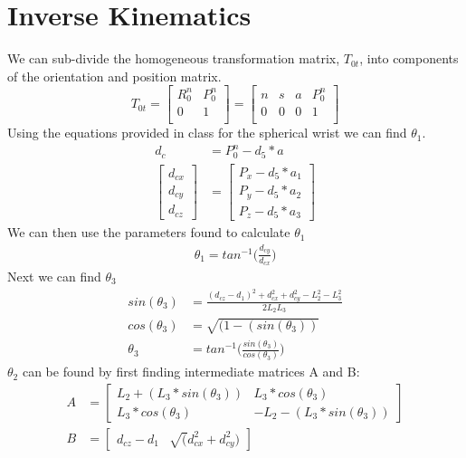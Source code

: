 \documentclass[12pt]{article}
\begin{document}
\section{Inverse Kinematics}
We can sub-divide the homogeneous transformation matrix, $T_{0t}$, into components of the orientation and position matrix.
\[
T_{0t} =
\begin{bmatrix}
         R_0^n & P_0^n\\
         0 & 1 \\
\end{bmatrix}
 = 
\begin{bmatrix}
         n & s & a & P_0^n\\
         0 & 0 & 0 & 1\\
\end{bmatrix}
\]
Using the equations provided in class for the spherical wrist we can find $\theta_1$.
\begin{align}
    d_c &= P_0^n - d_5*a\nonumber\\
    \begin{bmatrix}
         d_{cx}\\
         d_{cy}\\
         d_{cz}
\end{bmatrix}
&= 
    \begin{bmatrix}
         P_{x}-d_5*a_1\\
         P_{y}-d_5*a_2\\
         P_{z}-d_5*a_3\nonumber
\end{bmatrix}
\end{align}
We can then use the parameters found to calculate $\theta_1$
\begin{align}
    \theta_1 = tan^{-1}\bigg(\frac{d_{cy}}{d_{cx}}\bigg)
\end{align}
Next we can find $\theta_3$
\begin{align}
    sin(\theta_3) &= \frac{(d_{cz}-d_1)^2+d_{cx}^2+d_{cy}^2-L_2^2-L_3^2}{2L_2L_3}\nonumber\\
    cos(\theta_3) &= \sqrt{(1-(sin(\theta_3))}\nonumber\\
    \theta_3 &= tan^{-1}\bigg(\frac{sin(\theta_3)}{cos(\theta_3)}\bigg)
\end{align}
$\theta_2$ can be found by first finding intermediate matrices A and B:
\begin{align}
    A&=\begin{bmatrix}
             L_2+(L_3*sin(\theta_3)) & L_3*cos(\theta_3)\\
             L_3*cos(\theta_3) & -L_2-(L_3*sin(\theta_3))
    \end{bmatrix}\nonumber\\
    B&=\begin{bmatrix}
             d_{cz}-d_1 & \sqrt(d_{cx}^2+d_{cy}^2)
    \end{bmatrix}\nonumber
\end{align}
\end{document}

